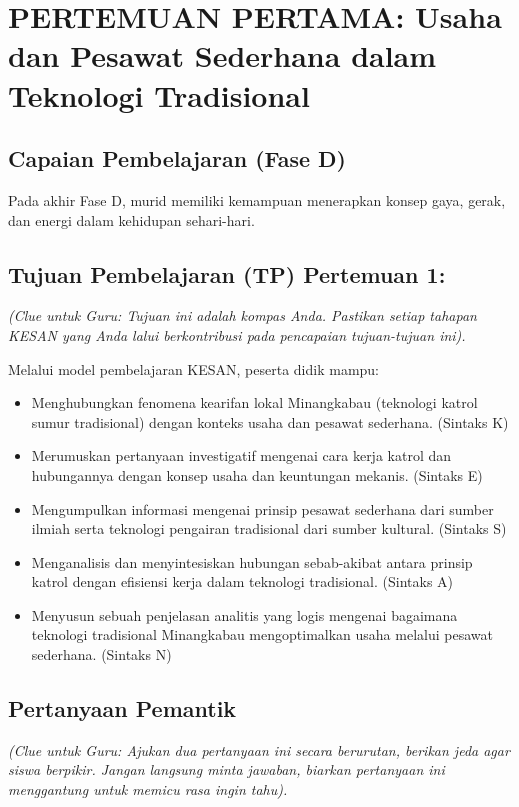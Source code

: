 \documentclass[a4paper,12pt]{article}
\begin{document}
\section{PERTEMUAN PERTAMA: Usaha dan Pesawat Sederhana dalam Teknologi Tradisional}

\subsection{Capaian Pembelajaran (Fase D)}
Pada akhir Fase D, murid memiliki kemampuan menerapkan konsep gaya, gerak, dan energi dalam kehidupan sehari-hari.

\subsection{Tujuan Pembelajaran (TP) Pertemuan 1:}
\textit{(Clue untuk Guru: Tujuan ini adalah kompas Anda. Pastikan setiap tahapan KESAN yang Anda lalui berkontribusi pada pencapaian tujuan-tujuan ini).}

Melalui model pembelajaran KESAN, peserta didik mampu:
\begin{itemize}
\item Menghubungkan fenomena kearifan lokal Minangkabau (teknologi katrol sumur tradisional) dengan konteks usaha dan pesawat sederhana. (Sintaks K)
\item Merumuskan pertanyaan investigatif mengenai cara kerja katrol dan hubungannya dengan konsep usaha dan keuntungan mekanis. (Sintaks E)
\item Mengumpulkan informasi mengenai prinsip pesawat sederhana dari sumber ilmiah serta teknologi pengairan tradisional dari sumber kultural. (Sintaks S)
\item Menganalisis dan menyintesiskan hubungan sebab-akibat antara prinsip katrol dengan efisiensi kerja dalam teknologi tradisional. (Sintaks A)
\item Menyusun sebuah penjelasan analitis yang logis mengenai bagaimana teknologi tradisional Minangkabau mengoptimalkan usaha melalui pesawat sederhana. (Sintaks N)
\end{itemize}

\subsection{Pertanyaan Pemantik}
\textit{(Clue untuk Guru: Ajukan dua pertanyaan ini secara berurutan, berikan jeda agar siswa berpikir. Jangan langsung minta jawaban, biarkan pertanyaan ini menggantung untuk memicu rasa ingin tahu).}
\end{document}
